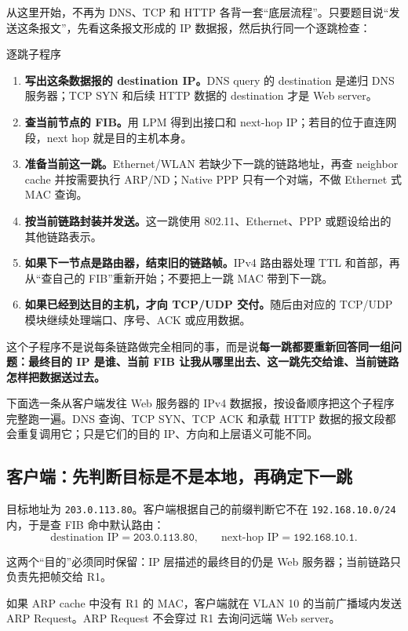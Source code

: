 \documentclass[UTF8,fontset=none,11pt,a4paper]{ctexart}
\begin{document}
从这里开始，不再为 DNS、TCP 和 HTTP 各背一套“底层流程”。只要题目说“发送这条报文”，先看这条报文形成的 IP 数据报，然后执行同一个逐跳检查：

\begin{methodbox}{逐跳子程序}
\begin{enumerate}
  \item \textbf{写出这条数据报的 destination IP。}DNS query 的 destination 是递归 DNS 服务器；TCP SYN 和后续 HTTP 数据的 destination 才是 Web server。
  \item \textbf{查当前节点的 FIB。}用 LPM 得到出接口和 next-hop IP；若目的位于直连网段，next hop 就是目的主机本身。
  \item \textbf{准备当前这一跳。}Ethernet/WLAN 若缺少下一跳的链路地址，再查 neighbor cache 并按需要执行 ARP/ND；Native PPP 只有一个对端，不做 Ethernet 式 MAC 查询。
  \item \textbf{按当前链路封装并发送。}这一跳使用 802.11、Ethernet、PPP 或题设给出的其他链路表示。
  \item \textbf{如果下一节点是路由器，结束旧的链路帧。}IPv4 路由器处理 TTL 和首部，再从“查自己的 FIB”重新开始；不要把上一跳 MAC 带到下一跳。
  \item \textbf{如果已经到达目的主机，才向 TCP/UDP 交付。}随后由对应的 TCP/UDP 模块继续处理端口、序号、ACK 或应用数据。
\end{enumerate}
\end{methodbox}

这个子程序不是说每条链路做完全相同的事，而是说\textbf{每一跳都要重新回答同一组问题：最终目的 IP 是谁、当前 FIB 让我从哪里出去、这一跳先交给谁、当前链路怎样把数据送过去。}

下面选一条从客户端发往 Web 服务器的 IPv4 数据报，按设备顺序把这个子程序完整跑一遍。DNS 查询、TCP SYN、TCP ACK 和承载 HTTP 数据的报文段都会重复调用它；只是它们的目的 IP、方向和上层语义可能不同。

\subsection{客户端：先判断目标是不是本地，再确定下一跳}

目标地址为 \texttt{203.0.113.80}。客户端根据自己的前缀判断它不在 \texttt{192.168.10.0/24} 内，于是查 FIB 命中默认路由：
\[
\text{destination IP}=\texttt{203.0.113.80},
\qquad
\text{next-hop IP}=\texttt{192.168.10.1}.
\]

这两个“目的”必须同时保留：IP 层描述的最终目的仍是 Web 服务器；当前链路只负责先把帧交给 R1。

如果 ARP cache 中没有 R1 的 MAC，客户端就在 VLAN 10 的当前广播域内发送 ARP Request。ARP Request 不会穿过 R1 去询问远端 Web server。
\end{document}
